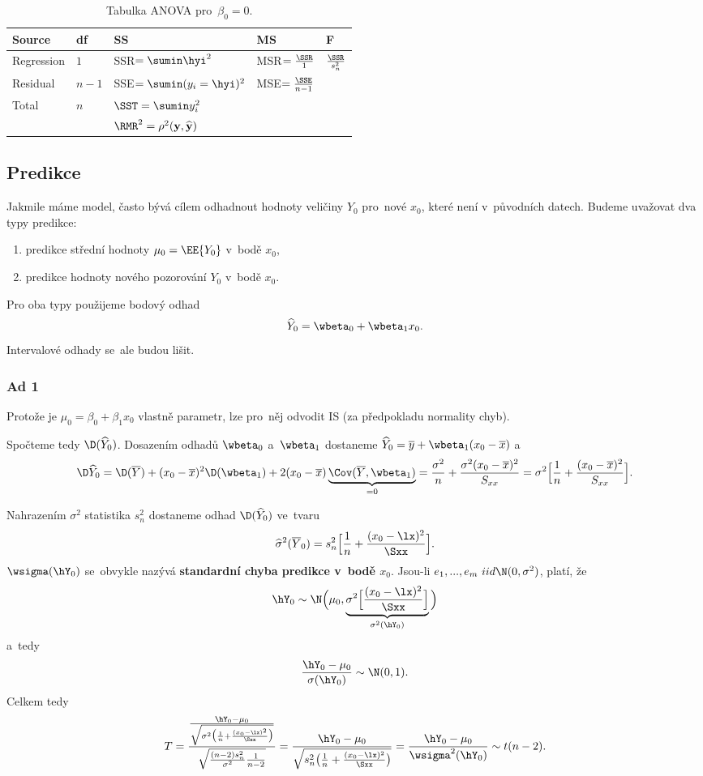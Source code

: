 \begin{table}[h]
	\begin{tabular}{lllll}
		Source & df & SS & MS & F \\
		\hline
		Regression & $1$ & SSR$=\sumin \hyi^{2}$ & MSR$=\frac{\SSR}{1}$ & $\frac{\SSR}{s_n^{2}}$ \\
		Residual & $n-1$ & SSE$=\sumin(y_i=\hyi)^{2}$ & MSE$=\frac{\SSE}{n-1}$ &  \\
		Total & $n$ & $\SST=\sumin y_i^{2}$ &  &  \\
		\hline
		&  & $\RMR^{2}=\rho^{2}(\textbf{y},\widehat{\textbf{y}})$ &  &  \\
	\end{tabular}
\caption{Tabulka ANOVA pro~$\beta_0=0$.}
\end{table}

\subsection{Predikce}
Jakmile máme model, často bývá cílem odhadnout hodnoty veličiny $Y_0$ pro~nové $x_0$, které není v~původních datech. Budeme uvažovat dva typy predikce:\begin{enumerate}
	\item predikce střední hodnoty $\mu_0=\EE{Y_0}$ v~bodě $x_0$,
	\item predikce hodnoty nového pozorování $Y_0$ v~bodě $x_0$.
\end{enumerate}
Pro oba typy použijeme bodový odhad 
$$ \widehat{Y}_0=\wbeta_0+\wbeta_1 x_0.$$
Intervalové odhady se~ale budou lišit.

\subsubsection*{Ad 1}
	Protože je $\mu_0=\beta_0+\beta_1 x_0$ vlastně parametr, lze pro~něj odvodit IS (za předpokladu normality chyb). 
	
	Spočteme tedy $\D(\widehat{Y}_0)$. Dosazením odhadů $\wbeta_0$ a~$\wbeta_1$ dostaneme $\widehat{Y}_0=\overline{y}+\wbeta_1(x_0-\overline{x})$ a
	$$ \D\widehat{Y}_0=\D(\overline{Y})+(x_0-\overline{x})^2\D(\wbeta_1)+2(x_0-\overline{x})\underbrace{\Cov(\overline{Y},\wbeta_1)}_{=0}=\frac{\sigma^2}{n}+\frac{\sigma^2(x_0-\overline{x})^2}{S_{xx}}=\sigma^2\Big[ \frac{1}{n}+\frac{(x_0-\overline{x})^2}{S_{xx}} \Big].$$
	
	Nahrazením $\sigma^2$ statistika $s_n^2$ dostaneme odhad $\D(\widehat{Y}_0)$ ve~tvaru 
	$$ \widehat{\sigma}^2(\overline{Y}_0)=s_n^2\Big[ \frac{1}{n}+\frac{(x_0-\lx)^2}{\Sxx} \Big].$$
	$\wsigma(\hY_0)$ se~obvykle nazývá \textbf{standardní chyba predikce v~bodě $x_0$}. Jsou-li $e_1,...,e_m~iid\N(0,\sigma^2)$, platí, že 
	$$ \hY_0\sim\N\Big( \mu_0,\underbrace{\sigma^2\Big[ \frac{(x_0-\lx)^2}{\Sxx} \Big]}_{\sigma^2(\hY_0)} \Big) $$ a~tedy 
	$$ \frac{\hY_0-\mu_0}{\sigma(\hY_0)}\sim\N(0,1). $$
	Celkem tedy 
	$$ T=\frac{\frac{\hY_0-\mu_0}{\sqrt{\sigma^2\big(\frac{1}{n}+\frac{(x_0-\lx)^2}{\Sxx}\big)}}}{\sqrt{\frac{(n-2)s_n^2}{\sigma^2}\frac{1}{n-2}}}=\frac{\hY_0-\mu_0}{\sqrt{s_n^2\big( \frac{1}{n}+\frac{(x_0-\lx)^2}{\Sxx} \big)}}=\frac{\hY_0-\mu_0}{\wsigma^2(\hY_0)}\sim t(n-2).$$ 
	
